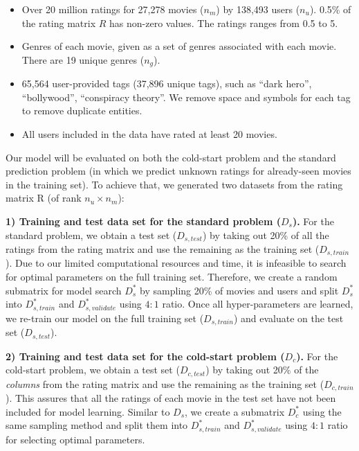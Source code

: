 \documentclass{article} %
\begin{document}
\begin{itemize}[leftmargin=15pt]
	\item Over 20 million ratings for 27,278 movies ($n_m$) by 138,493 users ($n_u$).
	0.5\% of the rating matrix $R$ has non-zero values.  The ratings ranges from 0.5 to 5.

	\item Genres of each movie, given as a set of genres associated with each
movie. There are 19 unique genres ($n_g$).

	\item 65,564 user-provided tags (37,896 unique tags), such as ``dark hero'', ``bollywood'',
	``conspiracy theory''.  We remove space and symbols for each tag to remove duplicate entities.

	\item All users included in the data have rated at least 20 movies.
\end{itemize}

Our model will be evaluated on both the cold-start problem and the standard
prediction problem (in which we predict unknown ratings for already-seen
movies in the training set). To achieve that, we generated two datasets from the
rating matrix R (of rank $n_u \times n_m$):

\textbf{1) Training and test data set for the standard problem ($D_s$).} For
the standard problem, we obtain a test set ($D_{s,test}$) by taking out 20\%
of all the ratings from the rating matrix and use the remaining as the
training set ($D_{s,train}$). Due to our limited computational resources and
time, it is infeasible to search for optimal parameters on the full training
set. Therefore, we create a random submatrix for model search $D^*_{s}$ by
sampling 20\% of movies and users and split $D^*_{s}$ into $D^*_{s,train}$ and
$D^*_{s,validate}$ using $4:1$ ratio. Once all hyper-parameters are learned,
we re-train our model on the full training set ($D_{s,train}$) and evaluate on
the test set ($D_{s,test}$).

\textbf{2) Training and test data set for the cold-start problem ($D_c$).} For
the cold-start problem, we obtain a test set ($D_{c,test}$) by taking out 20\%
of   the {\em columns} from the rating matrix and use the remaining as the
training set ($D_{c,train}$). This assures that all the ratings of each movie
in the test set have not been included for model learning.   Similar to $D_s$, we create a submatrix $D^*_{c}$ using the same sampling method and
split them into $D^*_{s,train}$ and $D^*_{s,validate}$ using $4:1$ ratio for
selecting optimal parameters.
\end{document}
